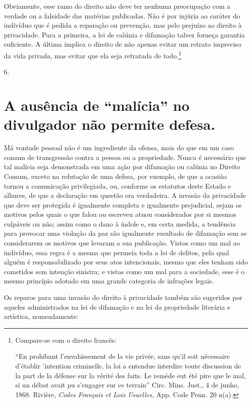 Obviamente, esse ramo do direito não deve ter nenhuma preocupação com a
verdade ou a falsidade das matérias publicadas. Não é por injúria ao
caráter do indivíduo que é pedida a reparação ou prevenção, mas pelo
prejuízo ao direito à privacidade. Para a primeira, a lei de calúnia e
difamação talvez forneça garantia suficiente. A última implica o direito
de não apenas evitar um retrato impreciso da vida privada, mas evitar
que ela seja retratada de todo.\footnote{Compare-se com o direito
  francês:

  ``En prohibant l'envahissement de la vie privée, sans qu'il soit
  nêcessaire d'établir 'intention criminelle, la loi a entendue
  interdire toute discussion de la part de la défense sur la vêrité des
  faits. Le remède eut été pire que le mal, si un débat avait pu
  s'engager sur ce terrain'' Circ. Mins. Just., 4 de junho, 1868.
  Rivière, \emph{Codes Français et Lois Usuelles,} App. Code Penn. 20
  n(a).}

6. \section{A ausência de ``malícia'' no divulgador não permite defesa.}

Má vontade pessoal não é um ingrediente da ofensa, mais do que em um
caso comum de transgressão contra a pessoa ou a propriedade. Nunca é
necessário que tal malícia seja demonstrada em uma ação por difamação ou
calúnia no Direito Comum, exceto na refutação de uma defesa, por
exemplo, de que a ocasião tornou a comunicação privilegiada, ou,
conforme os estatutos deste Estado e alhures, de que a declaração em
questão era verdadeira. A invasão da privacidade que deve ser protegida
é igualmente completa e igualmente prejudicial, sejam os motivos pelos
quais o que falou ou escreveu atuou considerados por si mesmos culpáveis
ou não; assim como o dano à índole e, em certa medida, a tendência para
provocar uma violação da paz são igualmente resultado de difamação sem
se considerarem os motivos que levaram a sua publicação. Vistos como um
mal ao indivíduo, essa regra é a mesma que permeia toda a lei de
delitos, pela qual alguém é responsabilizado por seus atos intencionais,
mesmo que eles tenham sido cometidos sem intenção sinistra; e vistas
como um mal para a sociedade, esse é o mesmo princípio adotado em uma
grande categoria de infrações legais.

Os reparos para uma invasão do direito à privacidade também são
sugeridos por aqueles administrados na lei de difamação e na lei da
propriedade literária e artística, nomeadamente:

